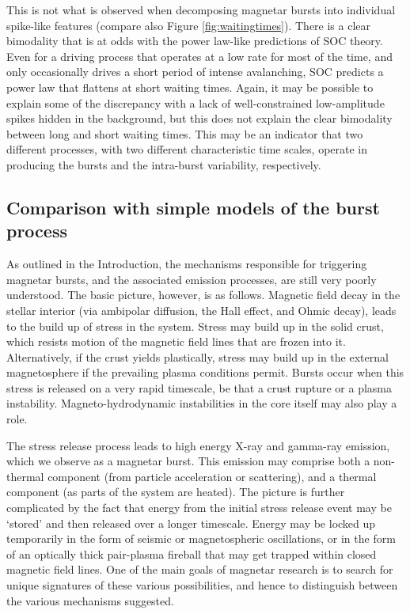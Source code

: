 \documentclass[12pt]{emulateapj}
\begin{document}
This is not what is observed when decomposing magnetar bursts into individual spike-like features (compare also Figure \ref{fig:waitingtimes}). There is a
clear bimodality that is at odds with the power law-like predictions of SOC theory. Even for a driving process that operates at a low
rate for most of the time, and only occasionally drives a short period of intense avalanching, SOC predicts a power law that flattens at short
waiting times. Again, it may be possible to explain some of the discrepancy with a lack of well-constrained low-amplitude spikes hidden in 
the background, but this does not explain the clear bimodality between long and short waiting times. This may be an indicator that two different
processes, with two different characteristic time scales, operate in producing the bursts and the intra-burst variability, respectively. 


\subsection{Comparison with simple models of the burst process}
As outlined in the Introduction, the mechanisms responsible for triggering magnetar bursts, and the associated emission processes, are still very poorly understood. The basic picture, however, is as follows. Magnetic field decay in the stellar interior (via ambipolar diffusion, the Hall effect, and Ohmic decay), leads to the build up of stress in the system. Stress may build up in the solid crust, which resists motion of the magnetic field lines that are frozen into it. Alternatively, if the crust yields plastically, stress may build up in the external magnetosphere if the prevailing plasma conditions permit. Bursts occur when this stress is released on a very rapid timescale, be that a crust rupture or a plasma instability. Magneto-hydrodynamic instabilities in the core itself may also play a role.

The stress release process leads to high energy X-ray and gamma-ray emission, which we observe as a magnetar burst. This emission may comprise both a non-thermal component (from particle acceleration or scattering), and a thermal component (as parts of the system are heated). The picture is further complicated by the fact that energy from the initial stress release event may be `stored' and then released over a longer timescale. Energy may be locked up temporarily in the form of seismic or magnetospheric oscillations, or in the form of an optically thick pair-plasma fireball that may get trapped within closed magnetic field lines. One of the main goals of magnetar research is to search for unique signatures of these various possibilities, and hence to distinguish between the various mechanisms suggested.
\end{document}
